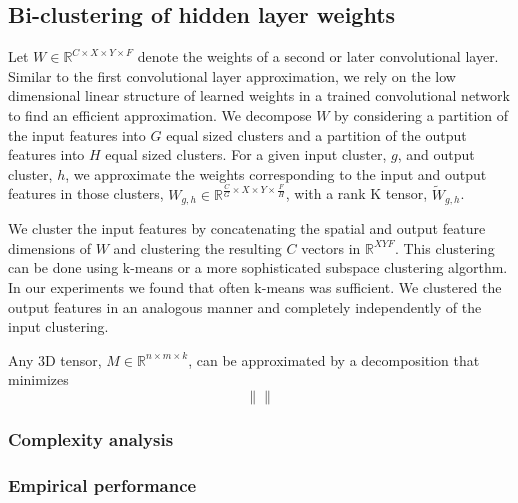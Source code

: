 \subsection{Bi-clustering of hidden layer weights}
Let $W \in \mathbb{R}^{C \times X \times Y \times F}$ denote the weights of a second or later convolutional layer. Similar to the first convolutional layer approximation, we rely on the low dimensional linear structure of learned weights in a trained convolutional network to find an efficient approximation. We decompose $W$ by considering a partition of the input features into $G$ equal sized clusters and a partition of the output features into $H$ equal sized clusters. For a given input cluster, $g$, and output cluster, $h$, we approximate the weights corresponding to the input and output features in those clusters, $W_{g,h} \in \mathbb{R}^{\frac{C}{G} \times X \times Y \times \frac{F}{H}}$, with a rank K tensor, $\tilde{W}_{g,h}$.  

We cluster the input features by concatenating the spatial and output feature dimensions of $W$ and clustering the resulting $C$ vectors in $\mathbb{R}^{XYF}$. This clustering can be done using k-means or a more sophisticated subspace clustering algorthm. In our experiments we found that often k-means was sufficient. We clustered the output features in an analogous manner and completely independently of the input clustering. 

Any 3D tensor, $M \in \mathbb{R}^{n \times m \times k}$, can be approximated by a decomposition that minimizes 
\begin{equation*}
	\|  \|
\end{equation*} 


\subsubsection{Complexity analysis}

\subsubsection{Empirical performance}


